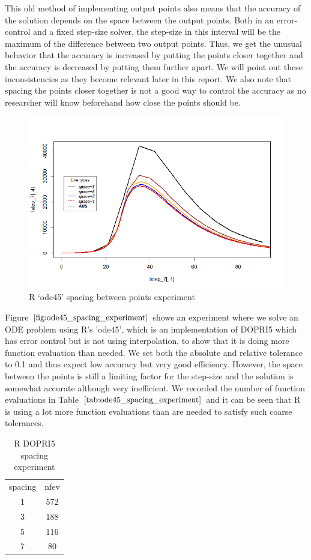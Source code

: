 This old method of implementing output points also means that the accuracy of the solution depends on the space between the output points. Both in an error-control and a fixed step-size solver, the step-size in this interval will be the maximum of the difference between two output points. Thus, we get the unusual behavior that the accuracy is increased by putting the points closer together and the accuracy is decreased by putting them further apart. We will point out these inconsistencies as they become relevant later in this report. We also note that spacing the points closer together is not a good way to control the accuracy as no researcher will know beforehand how close the points should be.

\begin{figure}[h]
\centering
\includegraphics[width=0.7\linewidth]{./figures/R_ode45_spacing_experiment}
\caption{R `ode45' spacing between points experiment}
\label{fig:ode45_spacing_experiment}
\end{figure}

Figure $\ref{fig:ode45_spacing_experiment}$ shows an experiment where we solve an ODE problem using R's 'ode45', which is an implementation of DOPRI5 which has error control but is not using interpolation, to show that it is doing more function evaluation than needed. We set both the absolute and relative tolerance to 0.1 and thus expect low accuracy but very good efficiency. However, the space between the points is still a limiting factor for the step-size and the solution is somewhat accurate although very inefficient. We recorded the number of function evaluations in Table $\ref{tab:ode45_spacing_experiment}$ and it can be seen that R is using a lot more function evaluations than are needed to satisfy such coarse tolerances.

\begin{table}[h]
\caption {R DOPRI5 spacing experiment} \label{tab:ode45_spacing_experiment} 
\begin{center}
\begin{tabular}{ c c }
spacing & nfev \\ 
1 & 572 \\
3 & 188 \\
5 & 116 \\
7 & 80 \\
\end{tabular}
\end{center}
\end{table}

